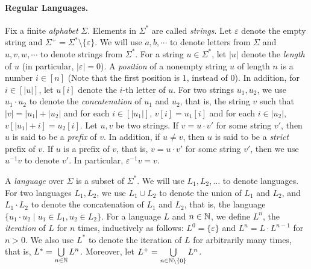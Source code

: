 \documentclass{llncs}
\begin{document}
\paragraph{Regular Languages.}
Fix a finite \emph{alphabet} $\Sigma$. Elements in $\Sigma^*$ are called \emph{strings}. Let $\varepsilon$ denote the empty string and  $\Sigma^+ = \Sigma^* \setminus \{\varepsilon\}$. We will use $a,b,\cdots$ to denote letters from $\Sigma$ and $u, v, w, \cdots$ to denote strings from $\Sigma^*$. For a string $u \in \Sigma^*$, let $|u|$ denote the \emph{length} of $u$ (in particular, $|\varepsilon|=0$). A \emph{position} of a nonempty string $u$ of length $n$ is a number $i \in [n]$ (Note that the first position is $1$, instead of  0). In addition, for $i \in [|u|]$, let $u[i]$ denote the $i$-th letter of $u$. 
For two strings $u_1, u_2$, we use $u_1 \cdot u_2$ to denote the \emph{concatenation} of $u_1$ and $u_2$, that is, the string $v$ such that $|v|= |u_1| + |u_2|$ and for each $i \in [|u_1|]$, $v[i]= u_1[i]$ and for each $i \in |u_2|$, $v[|u_1|+i]=u_2[i]$. Let $u, v$ be two strings. If $v = u \cdot v'$ for some string $v'$, then $u$ is said to be a \emph{prefix} of $v$. In addition, if $u \neq v$, then $u$ is said to be a \emph{strict} prefix of $v$. If $u$ is a prefix of $v$, that is, $v = u \cdot v'$ for some string $v'$, then 
we use $u^{-1} v$ to denote $v'$. In particular, $\varepsilon^{-1} v = v$.

A \emph{language} over $\Sigma$ is a subset of $\Sigma^*$. We will use $L_1, L_2, \dots$ to denote languages. For two languages $L_1, L_2$, we use $L_1 \cup L_2$ to denote the union of $L_1$ and $L_2$, and $L_1 \cdot L_2$ to denote the concatenation of $L_1$ and $L_2$, that is, the language $\{u_1 \cdot u_2 \mid u_1 \in L_1, u_2 \in L_2\}$. For a language $L$ and $n \in \mathbb{N}$, we define $L^n$, the \emph{iteration} of $L$ for $n$ times, inductively as follows: $L^0=\{\varepsilon\}$ and $L^{n} =L \cdot L^{n-1}$ for $n > 0$. We also use $L^*$ to denote the iteration of $L$ for arbitrarily many times, that is, $L^* = \bigcup \limits_{n \in \mathbb{N}} L^n$. Moreover, let $L^+ = \bigcup \limits_{n \in \mathbb{N} \setminus \{0\}} L^n$.
\end{document}
